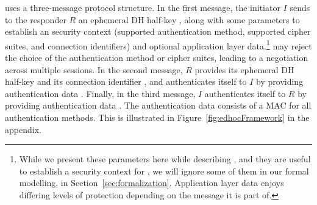 
%
\mEdhoc{} uses a three-message protocol structure.
%
In the first message, the initiator $I$ sends to the responder $R$ an
ephemeral DH half-key \mGx{}, along with some parameters to establish an \mOscore{} security context (supported authentication method, supported cipher suites, and connection identifiers) and optional application layer data.\footnote{While we present these parameters here while describing \mEdhoc, and they are useful to establish a security context for \mOscore, we will ignore some of them in our formal modelling, in Section~\ref{sec:formalization}. Application layer data enjoys differing levels of protection depending on the message it is part of.}  may reject the choice of the authentication method or cipher suites, leading to a negotiation across multiple \mEdhoc{} sessions.
%
In the second message, $R$ provides its ephemeral
DH half-key \mGy{} and its connection identifier \mCr, and authenticates itself
to $I$ by providing authentication data \mAuthr{}.
%
Finally, in the third message, $I$ authenticates itself
to $R$ by providing authentication data \mAuthi{}.
%
The authentication data consists of a MAC for all authentication methods.
%
This is illustrated in Figure~\ref{fig:edhocFramework} in the appendix.
%
%
%
